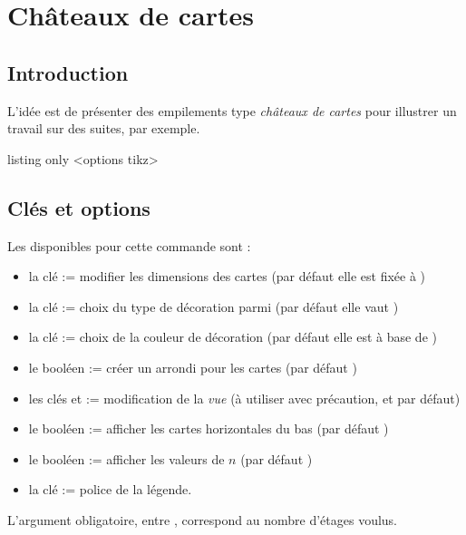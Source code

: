 \pagebreak

\section{Châteaux de cartes}\label{chateaux}

\subsection{Introduction}

\begin{tipblock}
 L'idée est de présenter des empilements type \textit{châteaux de cartes} pour illustrer un travail sur des suites, par exemple.
\end{tipblock}

\begin{PresCodeTexPL}{listing only}
<options tikz>
\end{PresCodeTexPL}

\begin{PresCodeTexPL}{}
\end{PresCodeTexPL}

\subsection{Clés et options}

\begin{cautionblock}
Les  disponibles pour cette commande sont :

\begin{itemize}
	\item la clé  := modifier les dimensions des cartes (par défaut elle est fixée à )
	\item la clé  := choix du type de décoration parmi  (par défaut elle vaut )
	\item la clé  := choix de la couleur de décoration (par défaut elle est à base de )
	\item le booléen  := créer un arrondi pour les cartes (par défaut )
	\item les clés  et  := modification de la \textit{vue} (à utiliser avec précaution,  et  par défaut)
	\item le booléen  := afficher les cartes horizontales du bas (par défaut )
	\item le booléen  := afficher les valeurs de $n$ (par défaut )
	\item la clé  := police de la légende.
\end{itemize}

L'argument obligatoire, entre , correspond au nombre d'étages voulus.
\end{cautionblock}

